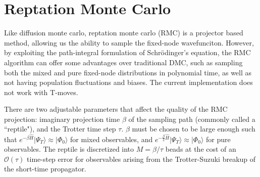 \section{Reptation Monte Carlo}
\label{sec:rmc}
Like diffusion monte carlo, reptation monte carlo (RMC) is a projector based method, allowing us the ability to sample the fixed-node wavefunciton.  However, by exploiting the path-integral formulation of Schr\"{o}dinger's equation, the RMC algorithm can offer some advantages over traditional DMC, such as sampling both the mixed and pure fixed-node distributions in polynomial time, as well as not having population fluctuations and biases.  The current implementation does not work with T-moves.

There are two adjustable parameters that affect the quality of the RMC projection:  imaginary projection time $\beta$ of the sampling path (commonly called a ``reptile"), and the Trotter time step $\tau$.  $\beta$ must be chosen to be large enough such that $e^{-\beta \hat{H}}|\Psi_T\rangle \approx |\Phi_0\rangle$ for mixed observables, and $e^{-\frac{\beta}{2} \hat{H}}|\Psi_T\rangle \approx |\Phi_0\rangle$ for pure observables.  The reptile is discretized into $M=\beta/\tau$ beads at the cost of an $\mathcal{O}(\tau)$ time-step error for observables arising from the Trotter-Suzuki breakup of the short-time propagator.  

